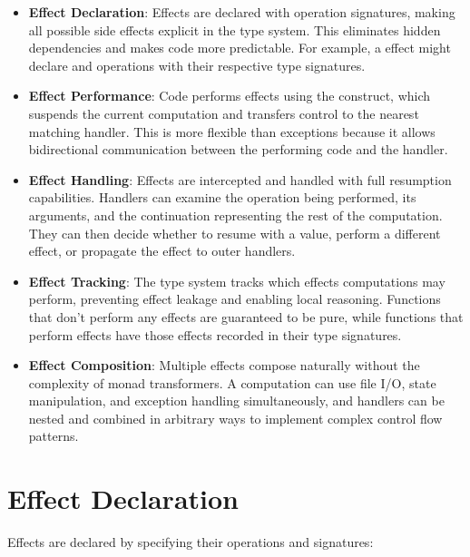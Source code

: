 \begin{itemize}
\item \textbf{Effect Declaration}: Effects are declared with operation signatures, making all possible side effects explicit in the type system. This eliminates hidden dependencies and makes code more predictable. For example, a  effect might declare  and  operations with their respective type signatures.

\item \textbf{Effect Performance}: Code performs effects using the  construct, which suspends the current computation and transfers control to the nearest matching handler. This is more flexible than exceptions because it allows bidirectional communication between the performing code and the handler.

\item \textbf{Effect Handling}: Effects are intercepted and handled with full resumption capabilities. Handlers can examine the operation being performed, its arguments, and the continuation representing the rest of the computation. They can then decide whether to resume with a value, perform a different effect, or propagate the effect to outer handlers.

\item \textbf{Effect Tracking}: The type system tracks which effects computations may perform, preventing effect leakage and enabling local reasoning. Functions that don't perform any effects are guaranteed to be pure, while functions that perform effects have those effects recorded in their type signatures.

\item \textbf{Effect Composition}: Multiple effects compose naturally without the complexity of monad transformers. A computation can use file I/O, state manipulation, and exception handling simultaneously, and handlers can be nested and combined in arbitrary ways to implement complex control flow patterns.
\end{itemize}

\section{Effect Declaration}
\label{sec:effect-declaration}


Effects are declared by specifying their operations and signatures:


